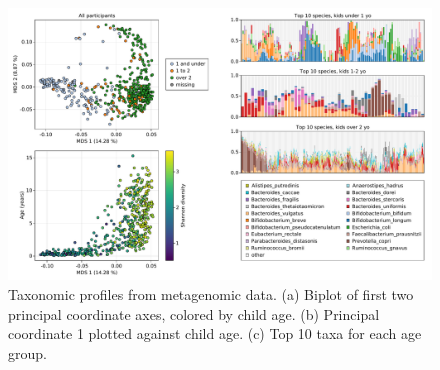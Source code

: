 \documentclass[fleqn,10pt]{wlscirep}
\begin{document}
\begin{figure}[ht]
\centering
\includegraphics[width=\linewidth]{../figures/03_taxonomic_profiles}
\caption{
    Taxonomic profiles from metagenomic data.
    (a) Biplot of first two principal coordinate axes, colored by child age.
    (b) Principal coordinate 1 plotted against child age.
    (c) Top 10 taxa for each age group.
}
\label{fig:taxonomic}
\end{figure}
\end{document}
